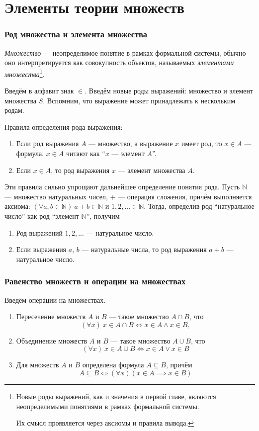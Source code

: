 \part{Элементы теории множеств}

\section{Род множества и элемента множества}

 {\it Множество} --- неопределимое понятие в рамках формальной системы,
обычно оно интерпретируется как совокупность объектов,
называемых {\it элементами множества}\footnote{
	Новые роды выражений, как и значения в первой главе,
	являются неопределимыми понятиями в рамках
	формальной системы.

	Их смысл проявляется через аксиомы и правила вывода.
}.

Введём в алфавит знак $\in$.
Введём новые роды выражений: множество и элемент множества $S$.
Вспомним, что выражение может принадлежать к нескольким родам.

Правила определения рода выражения:
\begin{enumerate}
	\item{}Если род выражения $A$ --- множество, а выражение $x$
	имеет род, то $x\in A$ --- формула.
	$x\in A$ читают как ``$x$ --- элемент $A$''.
	\item{}Если $x\in A$, то род выражения $x$ --- элемент множества $A$.
\end{enumerate}

\newcommand\N{\mathbb N}
Эти правила сильно упрощают дальнейшее определение понятия рода.
Пусть $\N$ --- множество
натуральных чисел, $+$ --- операция сложения, причём выполняется
аксиома: $(\forall a,b\in\N)~a+b\in\N$
и $1,2,...\in\N$. Тогда, определив род ``натуральное число'' как род ``элемент $\N$'',
получим
\begin{enumerate}
	\item{}Род выражений $1,2,...$ --- натуральное число.
	\item{}Если выражения $a$, $b$ --- натуральные числа,
	то род выражения $a+b$ --- натуральное число.
\end{enumerate}

\section{Равенство множеств и операции на множествах}

Введём операции на множествах.
\begin{enumerate}
	\item{}Пересечение множеств $A$ и $B$ --- такое множество $A\cap B$, что
	\[
		(\forall x)~x\in A\cap B\iff x\in A\land x\in B,
	\]

	\item{}Объединение множеств $A$ и $B$ --- такое множество $A\cup B$, что
	\[
		(\forall x)~x\in A\cup B\iff x\in A\lor x\in B
	\]

	\item{}Для множеств $A$ и $B$ определена формула $A\subseteq B$, причём
	\[
		A\subseteq B\iff (\forall x)(x\in A\implies x\in B)
	\]
\end{enumerate}

